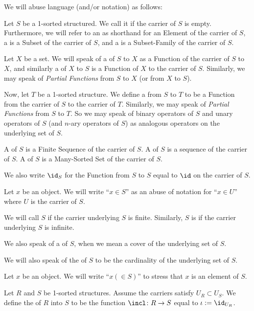 \begin{remark}
We will abuse language (and/or notation) as follows:

Let $S$ be a 1-sorted structured. We call it  if the
carrier of $S$ is empty. Furthermore, we will refer to an
 as shorthand for an Element of the carrier of $S$,
a  is a Subset of the carrier of $S$, and a
 is a Subset-Family of the carrier of $S$.

Let $X$ be a set. We will speak of a  of $S$ to $X$
as a Function of the carrier of $S$ to $X$, and similarly a
 of $X$ to $S$ is a Function of $X$ to the carrier of $S$.
Similarly, we may speak of \emph{Partial Functions} from $S$ to $X$
(or from $X$ to $S$).

Now, let $T$ be a 1-sorted structure. We define a 
from $S$ to $T$ to be a Function from the carrier of $S$ to the
carrier of $T$. Similarly, we may speak of \emph{Partial Functions}
from $S$ to $T$. So we may speak of binary operators of $S$ and unary
operators of $S$ (and $n$-ary operators of $S$) as analogous operators
on the underlying set of $S$.

A  of $S$ is a Finite Sequence of the carrier
of $S$. A  of $S$ is a sequence of the carrier of $S$.
A  of $S$ is a Many-Sorted Set of the
carrier of $S$.

We also write $\id_{S}$ for the Function from $S$ to $S$ equal to
$\id$ on the carrier of $S$.

Let $x$ be an object. We will write ``$x\in S$'' as an abuse of
notation for ``$x\in U$'' where $U$ is the carrier of $S$.

We will call $S$  if the carrier underlying $S$ is
finite. Similarly, $S$ is  if the carrier underlying
$S$ is infinite.

We also speak of a  of $S$, when we mean a cover of the
underlying set of $S$.

We will also speak of the  of $S$ to be the
cardinality of the underlying set of $S$.

Let $x$ be an object. We will write ``$x(\in S)$'' to stress that $x$ is
an element of $S$.
\end{remark}

\begin{definition}\label{yellow_9:def 1}
Let $R$ and $S$ be 1-sorted structures. Assume the carriers satisfy
$U_{R}\subset U_{S}$. We define the  of $R$ into $S$
to be the function $\incl\colon R\to S$ equal to $\iota:=\id_{U_{R}}$. 
\end{definition}

